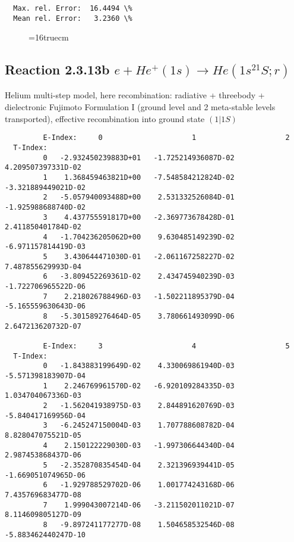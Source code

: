 \documentclass[12pt,dvipdfmx]{article}
\begin{document}
{\begin{small}
\begin{verbatim}
  Max. rel. Error:  16.4494 \%
  Mean rel. Error:   3.2360 \%
\end{verbatim}\end{small}
\begin{figure} \label{2.3.13a}
\epsfxsize=16truecm
\end{figure}
\newpage
\subsection{
Reaction 2.3.13b  $e + He^+(1s) \rightarrow He(1s^21S;r) $
}
Helium multi-step model, here recombination: radiative + threebody + dielectronic
 Fujimoto Formulation I (ground level and 2 meta-stable levels transported),
effective recombination into ground state $(1|1S)$


\begin{small}\begin{verbatim}
         E-Index:     0                     1                     2
  T-Index:
         0   -2.932450239883D+01   -1.725214936087D-02    4.209507397331D-02
         1    1.368459463821D+00   -7.548584212824D-02   -3.321889449021D-02
         2   -5.057940093488D+00    2.531332526084D-01   -1.925988688740D-02
         3    4.437755591817D+00   -2.369773678428D-01    2.411850401784D-02
         4   -1.704236205062D+00    9.630485149239D-02   -6.971157814419D-03
         5    3.430644471030D-01   -2.061167258227D-02    7.487855629993D-04
         6   -3.809452269361D-02    2.434745940239D-03   -1.722706965522D-06
         7    2.218026788496D-03   -1.502211895379D-04   -5.165559630643D-06
         8   -5.301589276464D-05    3.780661493099D-06    2.647213620732D-07

         E-Index:     3                     4                     5
  T-Index:
         0   -1.843883199649D-02    4.330069861940D-03   -5.571398183907D-04
         1    2.246769961570D-02   -6.920109284335D-03    1.034704067336D-03
         2   -1.562041938975D-03    2.844891620769D-03   -5.840417169956D-04
         3   -6.245247150004D-03    1.707788608782D-04    8.828047075521D-05
         4    2.150122229030D-03   -1.997306644340D-04    2.987453868437D-06
         5   -2.352870835454D-04    2.321396939441D-05   -1.669051074965D-06
         6   -1.929788529702D-06    1.001774243168D-06    7.435769683477D-08
         7    1.999043007214D-06   -3.211502011021D-07    8.114609805127D-09
         8   -9.897241177277D-08    1.504658532546D-08   -5.883462440247D-10


\end{verbatim}
\end{small}}
\end{document}
